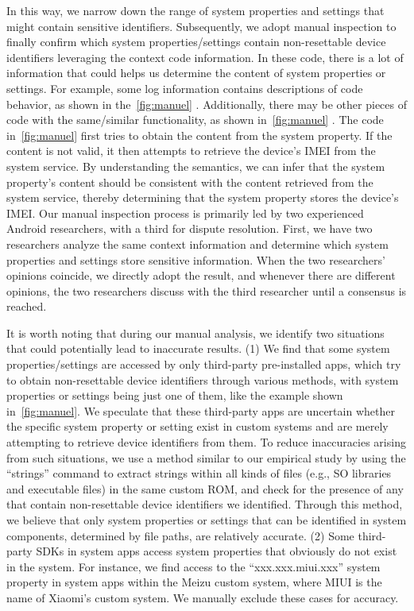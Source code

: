 In this way, we narrow down the range of system properties and settings that might contain sensitive identifiers.
Subsequently, we adopt manual inspection to finally confirm which system properties/settings contain non-resettable device identifiers leveraging the context code information.
In these code, there is a lot of information that could helps us determine the content of system properties or settings. 
For example, some log information contains descriptions of code behavior, as shown in the~\autoref{fig:manuel} .
Additionally, there may be other pieces of code with the same/similar functionality, as shown in~\autoref{fig:manuel} .
The code in~\autoref{fig:manuel} first tries to obtain the content from the system property. 
If the content is not valid, it then attempts to retrieve the device's IMEI from the system service. 
By understanding the semantics, we can infer that the system property's content should be consistent with the content retrieved from the system service, thereby determining that the system property stores the device's IMEI.
Our manual inspection process is primarily led by two experienced Android researchers, with a third for dispute resolution. 
First, we have two researchers analyze the same context information and determine which system properties and settings store sensitive information.
When the two researchers' opinions coincide, we directly adopt the result, and whenever there are different opinions, the two researchers discuss with the third researcher until a consensus is reached.

It is worth noting that during our manual analysis, we identify two situations that could potentially lead to inaccurate results.
(1) We find that some system properties/settings are accessed by only third-party pre-installed apps, which try to obtain non-resettable device identifiers through various methods, with system properties or settings being just one of them, like the example shown in~\autoref{fig:manuel}. 
We speculate that these third-party apps are uncertain whether the specific system property or setting exist in custom systems and are merely attempting to retrieve device identifiers from them. 
To reduce inaccuracies arising from such situations, we use a method similar to our empirical study by using the ``strings'' command to extract strings within all kinds of files (e.g., SO libraries and executable files) in the same custom ROM, and check for the presence of any that contain non-resettable device identifiers we identified. 
Through this method, we believe that only system properties or settings that can be identified in system components, determined by file paths, are relatively accurate.
(2) Some third-party SDKs in system apps access system properties that obviously do not exist in the system. 
For instance, we find access to the ``xxx.xxx.miui.xxx'' system property in system apps within the Meizu custom system, where MIUI is the name of Xiaomi's custom system. 
We manually exclude these cases for accuracy.

